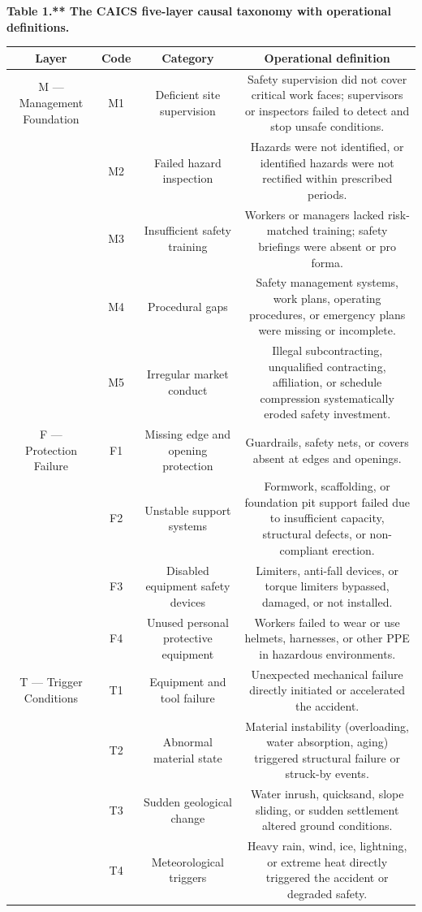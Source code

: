 \documentclass[11pt]{article}
\begin{document}
\textbf{Table 1.** The CAICS five-layer causal taxonomy with operational definitions.}
\begin{table}[htbp]
\centering
\small
\begin{tabular}{cccc}
\hline
Layer & Code & Category & Operational definition \\
\hline
M --- Management Foundation & M1 & Deficient site supervision & Safety supervision did not cover critical work faces; supervisors or inspectors failed to detect and stop unsafe conditions. \\
 & M2 & Failed hazard inspection & Hazards were not identified, or identified hazards were not rectified within prescribed periods. \\
 & M3 & Insufficient safety training & Workers or managers lacked risk-matched training; safety briefings were absent or pro forma. \\
 & M4 & Procedural gaps & Safety management systems, work plans, operating procedures, or emergency plans were missing or incomplete. \\
 & M5 & Irregular market conduct & Illegal subcontracting, unqualified contracting, affiliation, or schedule compression systematically eroded safety investment. \\
F --- Protection Failure & F1 & Missing edge and opening protection & Guardrails, safety nets, or covers absent at edges and openings. \\
 & F2 & Unstable support systems & Formwork, scaffolding, or foundation pit support failed due to insufficient capacity, structural defects, or non-compliant erection. \\
 & F3 & Disabled equipment safety devices & Limiters, anti-fall devices, or torque limiters bypassed, damaged, or not installed. \\
 & F4 & Unused personal protective equipment & Workers failed to wear or use helmets, harnesses, or other PPE in hazardous environments. \\
T --- Trigger Conditions & T1 & Equipment and tool failure & Unexpected mechanical failure directly initiated or accelerated the accident. \\
 & T2 & Abnormal material state & Material instability (overloading, water absorption, aging) triggered structural failure or struck-by events. \\
 & T3 & Sudden geological change & Water inrush, quicksand, slope sliding, or sudden settlement altered ground conditions. \\
 & T4 & Meteorological triggers & Heavy rain, wind, ice, lightning, or extreme heat directly triggered the accident or degraded safety. \\

\end{tabular}
\end{table}
\end{document}

